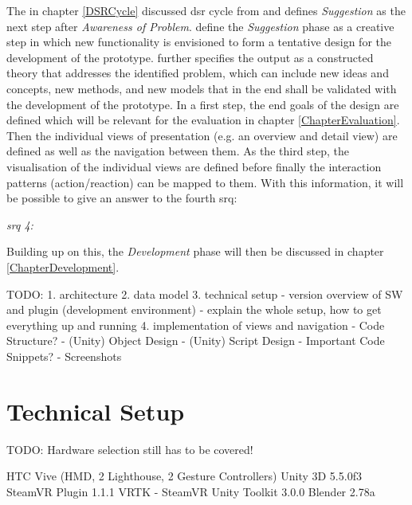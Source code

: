 The in chapter \ref{DSRCycle} discussed \gls{dsr} cycle from \cite{Vaishnavi2008} and \cite{Hevner2010} defines \textit{Suggestion} as the next step after \textit{Awareness of Problem}. \cite{Vaishnavi2008} define the \textit{Suggestion} phase as a creative step in which new functionality is envisioned to form a tentative design for the development of the prototype. \cite{Vaishnavi2008} further specifies the output as a constructed theory that addresses the identified problem, which can include new ideas and concepts, new methods, and new models that in the end shall be validated with the development of the prototype. In a first step, the end goals of the design are defined which will be relevant for the evaluation in chapter \ref{ChapterEvaluation}. Then the individual views of presentation (e.g. an overview and detail view) are defined as well as the navigation between them. As the third step, the visualisation of the individual views are defined before finally the interaction patterns (action/reaction) can be mapped to them. With this information, it will be possible to give an answer to the fourth \gls{srq}:
\begin{framed}
	\textit{\gls{srq} 4: \srqfourtext}
\end{framed}
Building up on this, the \textit{Development} phase will then be discussed in chapter \ref{ChapterDevelopment}.



TODO:
1. architecture
2. data model
3. technical setup
- version overview of SW and plugin (development environment)
- explain the whole setup, how to get everything up and running
4. implementation of views and navigation
- Code Structure?
- (Unity) Object Design
- (Unity) Script Design
- Important Code Snippets?
- Screenshots






\section{Technical Setup}

TODO: Hardware selection still has to be covered!

HTC Vive (HMD, 2 Lighthouse, 2 Gesture Controllers)
Unity 3D 5.5.0f3		\cite{Unity2016}
SteamVR Plugin 1.1.1		\cite{Valve2016a}
VRTK - SteamVR Unity Toolkit 3.0.0			\cite{Sysdia2017}
Blender 2.78a		\cite{Blender2016}

